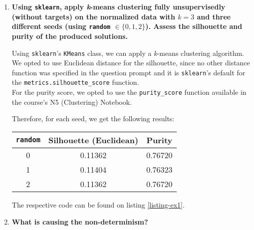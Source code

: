 \documentclass[12pt]{article}
\begin{document}
\begin{enumerate}[leftmargin=\labelsep]
    \item {\color{questioncolor}\bfseries
          Using \texttt{sklearn}, apply \textit{k}-means clustering fully unsupervisedly
          (without targets) on the normalized data with $k = 3$ and three different
          seeds (using \texttt{random} $\in \{0,1,2\}$).
          Assess the silhouette and purity of the produced solutions.
          }\\
          \vspace{0.5em}

          Using \texttt{sklearn}'s \texttt{KMeans} class, we can apply a
          \textit{k}-means clustering algorithm.\\
          We opted to use Euclidean distance for the silhouette, since no other distance
          function was specified in the question prompt
          and it is \texttt{sklearn}'s default for the
          \texttt{metrics.silhouette\_score} function.\\
          For the purity score, we opted to use the \texttt{purity\_score} function
          available in the course's N5 (Clustering) Notebook.

          Therefore, for each seed, we get the following results:

          \begin{center}
              \captionsetup{type=table}
              \begin{tabular}{c|cc}
                  \texttt{random}        & Silhouette (Euclidean) & Purity  \\
                  \hline
                  \textcolor{cred}{0}    & 0.11362                & 0.76720 \\
                  \textcolor{cblue}{1}   & 0.11404                & 0.76323 \\
                  \textcolor{corange}{2} & 0.11362                & 0.76720
              \end{tabular}
              \label{ex1p-silhouette-purity}
          \end{center}

          The respective code can be found on listing \ref{listing-ex1}.

    \item {\color{questioncolor}\bfseries
          What is causing the non-determinism?
          }\\
          \vspace{0.5em}


\end{enumerate}
\end{document}
